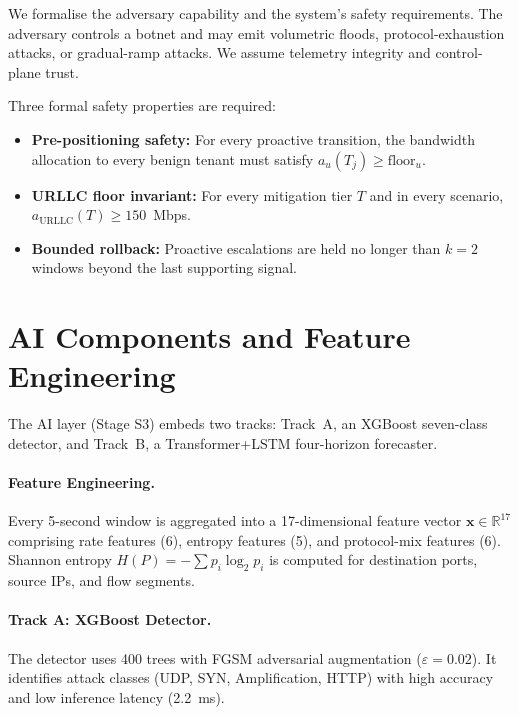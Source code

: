 We formalise the adversary capability and the system's safety requirements.
The adversary controls a botnet and may emit volumetric floods, protocol-exhaustion attacks, or gradual-ramp attacks. We assume telemetry integrity and control-plane trust.

Three formal safety properties are required:
\begin{itemize}
    \item \textbf{Pre-positioning safety:} For every proactive transition, the bandwidth allocation to every benign tenant must satisfy $a_u(T_j) \geq \text{floor}_u$.
    \item \textbf{URLLC floor invariant:} For every mitigation tier $T$ and in every scenario, $a_{\text{URLLC}}(T) \geq 150$~Mbps.
    \item \textbf{Bounded rollback:} Proactive escalations are held no longer than $k=2$ windows beyond the last supporting signal.
\end{itemize}

\section{AI Components and Feature Engineering}
\label{sec:ai-comp}

The AI layer (Stage S3) embeds two tracks: Track~A, an XGBoost seven-class detector, and Track~B, a Transformer+LSTM four-horizon forecaster.

\paragraph{Feature Engineering.} Every 5-second window is aggregated into a 17-dimensional feature vector $\mathbf{x} \in \mathbb{R}^{17}$ comprising rate features (6), entropy features (5), and protocol-mix features (6). Shannon entropy $H(P) = -\sum p_i \log_2 p_i$ is computed for destination ports, source IPs, and flow segments.

\paragraph{Track A: XGBoost Detector.} The detector uses 400 trees with FGSM adversarial augmentation ($\varepsilon = 0.02$). It identifies attack classes (UDP, SYN, Amplification, HTTP) with high accuracy and low inference latency (2.2~ms).

